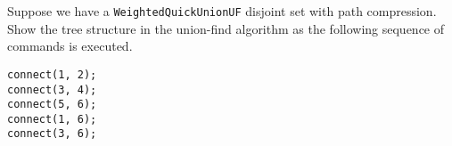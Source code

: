 \question Suppose we have a \texttt{WeightedQuickUnionUF} disjoint set with path compression. Show the tree structure in the union-find algorithm as the following sequence of commands is executed.

\begin{lstlisting}
connect(1, 2);
connect(3, 4);
connect(5, 6);
connect(1, 6);
connect(3, 6);
\end{lstlisting}

\begin{solution}[1in]
\begin{center}
\begin{tikzpicture}[very thick,level/.style={sibling distance=10mm/#1},level distance=30pt]

\end{tikzpicture}
\quad
{}
\end{center}
\end{solution}
